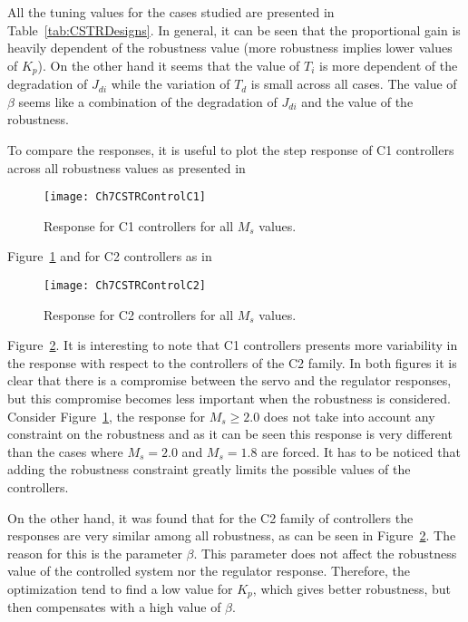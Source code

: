 All the tuning values for the cases studied are presented in Table~\ref{tab:CSTRDesigns}. In general, it can be seen that the proportional gain is heavily dependent of the robustness value (more robustness implies lower values of $K_p$). On the other hand it seems that the value of $T_i$ is more dependent of the degradation of $J_{di}$ while the variation of $T_d$ is small across all cases. The value of $\beta$ seems like a combination of the degradation of $J_{di}$ and the value of the robustness.

To compare the responses, it is useful to plot the step response of C1 controllers across all robustness values as presented in %
\begin{figure}[tb]
	\centering
	\texttt{[image: Ch7CSTRControlC1]}
	\caption{Response for C1 controllers for all $M_s$ values.}
	\label{fig:Ch7CSTRControlC1}
\end{figure}
%
Figure~\ref{fig:Ch7CSTRControlC1} and for C2 controllers as in %
\begin{figure}[tb]
	\centering
	\texttt{[image: Ch7CSTRControlC2]}
	\caption{Response for C2 controllers for all $M_s$ values.}
	\label{fig:Ch7CSTRControlC2}
\end{figure}
%
Figure~\ref{fig:Ch7CSTRControlC2}. It is interesting to note that C1 controllers presents more variability in the response with respect to the controllers of the C2 family. In both figures it is clear that there is a compromise between the servo and the regulator responses, but this compromise becomes less important when the robustness is considered. Consider Figure~\ref{fig:Ch7CSTRControlC1}, the response for $M_s \geq 2.0$ does not take into account any constraint on the robustness and as it can be seen this response is very different than the cases where $M_s = 2.0$ and $M_s = 1.8$ are forced. It has to be noticed that adding the robustness constraint greatly limits the possible values of the controllers.

On the other hand, it was found that for the C2 family of controllers the responses are very similar among all robustness, as can be seen in Figure~\ref{fig:Ch7CSTRControlC2}. The reason for this is the parameter $\beta$. This parameter does not affect the robustness value of the controlled system nor the regulator response. Therefore, the optimization tend to find a low value for $K_p$, which gives better robustness, but then compensates with a high value of $\beta$.

